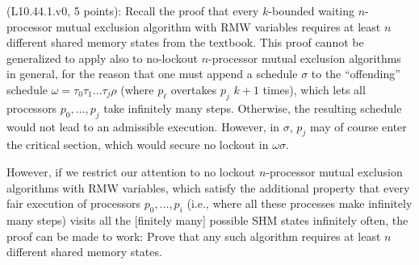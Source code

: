\begin{Exc}{(L10.44.1.v0, 5 points):}
Recall the proof that every $k$-bounded waiting $n$-processor mutual exclusion
algorithm with RMW variables requires at least $n$ different shared
memory states from the textbook. This proof cannot be generalized to apply also to no-lockout
$n$-processor mutual exclusion algorithms in general, for the reason that one must
append a schedule $\sigma$ to the ``offending'' schedule $\omega=\tau_0\tau_1\dots\tau_j\rho$
(where $p_{\ell}$ overtakes $p_j$ $k+1$ times), which lets all processors
$p_0,\dots,p_j$ take infinitely many steps. Otherwise, the resulting schedule
would not lead to an admissible execution. However, in $\sigma$, $p_j$ may of course enter the
critical section, which would secure no lockout in $\omega\sigma$.

However, if we restrict our attention to no lockout $n$-processor
mutual exclusion algorithms with RMW variables, which satisfy the additional
property that every fair execution of processors $p_0,\dots,p_i$
(i.e., where all these processes make infinitely many steps)
visits all the [finitely many] possible SHM states infinitely often,
the proof can be
made to work: Prove that any such algorithm requires at least $n$
different shared memory states.
\end{Exc}
